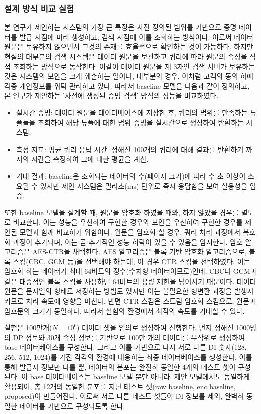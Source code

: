 \subsubsection{설계 방식 비교 실험}
본 연구가 제안하는 시스템의 가장 큰 특징은 사전 정의된 범위를 기반으로 증명 데이터를 발급 시점에 미리 생성하고, 검색 시점에 이를 조회하는 방식이다. 이로써 데이터 원문은 보유하지 않으면서 그것의 존재를 효율적으로 확인하는 것이 가능하다. 하지만 현실의 대부분의 검색 시스템은 데이터 원문을 보관하고 쿼리에 따라 원문의 속성을 직접 조회하는 방식으로 동작한다. 이같이 데이터 원문을 제 3자인 검색 서버가 보유하는 것은 시스템의 보안을 크게 훼손하는 일이나, 대부분의 경우, 이처럼 고객의 동의 하에 각종 개인정보를 위탁 관리하고 있다. 따라서 baseline 모델을 다음과 같이 정의하고, 본 연구가 제안하는 '사전에 생성된 증명 검색' 방식의 성능을 비교하였다.

\begin{itemize}
  \item 실시간 증명: 데이터 원문을 데이터베이스에 저장한 후, 쿼리의 범위를 만족하는 튜플들을 조회하여 해당 튜플에 대한 범위 증명을 실시간으로 생성하여 반환하는 시스템.
  \item 측정 지표: 평균 쿼리 응답 시간. 정해진 100개의 쿼리에 대해 결과를 반환하기 까지의 시간을 측정하여 그에 대한 평균을 계산.
  \item 기대 결과: baseline은 조회되는 데이터의 수(페이지 크기)에 따라 수 초 이상이 소요될 수 있지만 제안 시스템은 밀리초(ms) 단위로 즉시 응답함을 보여 실용성을 입증.
\end{itemize}

또한 baseline 모델을 설계할 때, 원문을 암호화 하였을 때와, 하지 않았을 경우를 별도로 비교한다. 이는 성능을 우선하여 구현한 경우와 보안을 우선하여 구현한 경우를 제안된 모델과 함께 비교하기 위함이다. 원문을 암호화 할 경우, 쿼리 처리 과정에서 복호화 과정이 추가되며, 이는 곧 추가적인 성능 하락이 있을 수 있음을 암시한다. 암호 알고리즘은 AES-CTR을 채택한다. AES 알고리즘은 블록 기반 암호화 알고리즘으로, 블록 스킴(CBC, GCM 등)을 선택해야 하는데, 이 경우 CTR 스킴을 선택하였다. 이는 암호화 하는 데이터가 최대 64비트의 정수(수치형 데이터이므로)인데, CBC나 GCM과 같은 대중적인 블록 스킴을 사용하면 64비트의 용량 제한을 넘어서기 때문이다. 데이터 원문을 문자열의 형태로 저장하는 방법도 있지만 이는 불필요한 형변환 과정을 발생시키므로 처리 속도에 영향을 미친다. 반면 CTR 스킴은 스트림 암호화 스킴으로, 원문과 암호문의 크기가 동일하다. 따라서 실험의 환경에서 최적의 속도를 기대할 수 있다.

\bigskip

실험은 100만개($N = 10^6$) 데이터 셋을 임의로 생성하여 진행한다. 먼저 정해진 1000명의 DP 정보와 30개 속성 정보를 기반으로 100만 개의 데이터를 무작위로 생성하여 base 데이터베이스를 구성한다. 그리고 이를 기반으로 다시 서로 다른 DI 숫자(128, 256, 512, 1024)를 가진 각각의 환경에 대응하는 최종 데이터베이스를 생성한다. 이를 통해 발급자 정보만 다를 뿐, 데이터의 분포는 완전히 동일한 4개의 테스트 셋이 구성된다. 이 base 데이터베이스는 baseline 모델 뿐만 아니라, 제안 모델에서도 동일하게 활용되어, 총 12개의 동일한 분포를 지닌 테스트 셋(raw baseline, enc baseline, proposed)이 만들어진다. 이로써 서로 다른 테스트 셋들이 DI 정보를 제외, 완벽히 동일한 데이터를 기반으로 구성되도록 한다.

